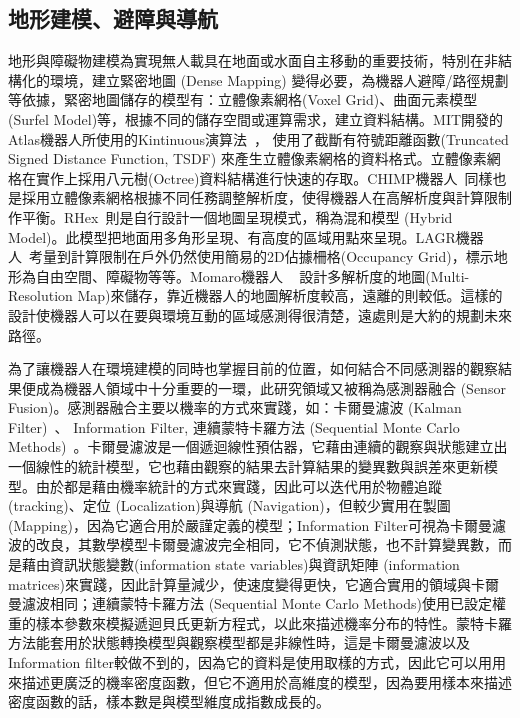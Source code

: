 \subsection{地形建模、避障與導航}

地形與障礙物建模為實現無人載具在地面或水面自主移動的重要技術，特別在非結構化的環境，建立緊密地圖 (Dense Mapping) 變得必要，為機器人避障/路徑規劃等依據，緊密地圖儲存的模型有：立體像素網格(Voxel Grid)、曲面元素模型(Surfel Model)等，根據不同的儲存空間或運算需求，建立資料結構。MIT開發的Atlas機器人所使用的Kintinuous演算法~\cite{whelan2012kintinuous}， 使用了截斷有符號距離函數(Truncated Signed Distance Function, TSDF) 來產生立體像素網格的資料格式。立體像素網格在實作上採用八元樹(Octree)資料結構進行快速的存取。CHIMP機器人~\cite{stentz2015chimp}同樣也是採用立體像素網格根據不同任務調整解析度，使得機器人在高解析度與計算限制作平衡。RHex~\cite{bogdan2009leaving}則是自行設計一個地圖呈現模式，稱為混和模型 (Hybrid Model)。此模型把地面用多角形呈現、有高度的區域用點來呈現。LAGR機器人~\cite{gerkey2008planning}考量到計算限制在戶外仍然使用簡易的2D佔據柵格(Occupancy Grid)，標示地形為自由空間、障礙物等等。Momaro機器人 ~\cite{droeschel2017continuous} 設計多解析度的地圖(Multi-Resolution Map)來儲存，靠近機器人的地圖解析度較高，遠離的則較低。這樣的設計使機器人可以在要與環境互動的區域感測得很清楚，遠處則是大約的規劃未來路徑。

為了讓機器人在環境建模的同時也掌握目前的位置，如何結合不同感測器的觀察結果便成為機器人領域中十分重要的一環，此研究領域又被稱為感測器融合 (Sensor Fusion)。感測器融合主要以機率的方式來實踐，如：卡爾曼濾波 (Kalman Filter)~\cite{gutmann2002markov}、 Information Filter, 連續蒙特卡羅方法 (Sequential Monte Carlo Methods)~\cite{thrun2001robust}。卡爾曼濾波是一個遞迴線性預估器，它藉由連續的觀察與狀態建立出一個線性的統計模型，它也藉由觀察的結果去計算結果的變異數與誤差來更新模型。由於都是藉由機率統計的方式來實踐，因此可以迭代用於物體追蹤 (tracking)、定位 (Localization)與導航 (Navigation)，但較少實用在製圖 (Mapping)，因為它適合用於嚴謹定義的模型；Information Filter可視為卡爾曼濾波的改良，其數學模型卡爾曼濾波完全相同，它不偵測狀態，也不計算變異數，而是藉由資訊狀態變數(information state variables)與資訊矩陣 (information matrices)來實踐，因此計算量減少，使速度變得更快，它適合實用的領域與卡爾曼濾波相同；連續蒙特卡羅方法 (Sequential Monte Carlo Methods)使用已設定權重的樣本參數來模擬遞迴貝氏更新方程式，以此來描述機率分布的特性。蒙特卡羅方法能套用於狀態轉換模型與觀察模型都是非線性時，這是卡爾曼濾波以及Information filter較做不到的，因為它的資料是使用取樣的方式，因此它可以用用來描述更廣泛的機率密度函數，但它不適用於高維度的模型，因為要用樣本來描述密度函數的話，樣本數是與模型維度成指數成長的。

